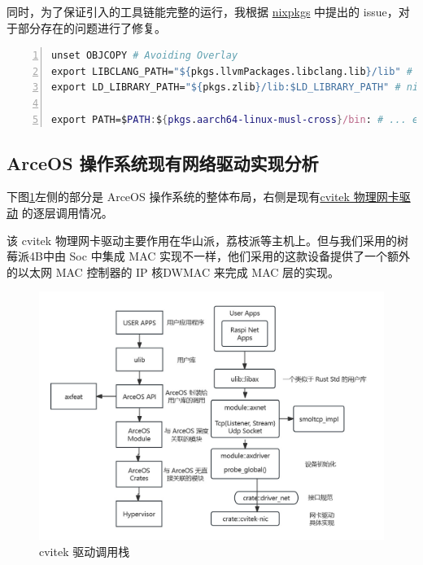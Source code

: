     同时，为了保证引入的工具链能完整的运行，我根据 \href{https://github.com/nixos/nixpkgs}{nixpkgs} 中提出的 issue，对于部分存在的问题进行了修复。

    \begin{lstlisting}[language=nix
        , caption=flakes 特殊适配
        , numbers = left
        , breaklines=true
        , breakatwhitespace=true]
unset OBJCOPY # Avoiding Overlay
export LIBCLANG_PATH="${pkgs.llvmPackages.libclang.lib}/lib" # nixpkgs@52447
export LD_LIBRARY_PATH="${pkgs.zlib}/lib:$LD_LIBRARY_PATH" # nixpkgs@92946

export PATH=$PATH:${pkgs.aarch64-linux-musl-cross}/bin: # ... etc
    \end{lstlisting}



\subsection{ArceOS 操作系统现有网络驱动实现分析}

    下图\ref{fig::cvitek}左侧的部分是 ArceOS 操作系统的整体布局，右侧是现有\href{https://github.com/yuoo655/arceos_net/tree/hsp}{cvitek 物理网卡驱动} 的逐层调用情况。

    该 cvitek 物理网卡驱动主要作用在华山派，荔枝派等主机上。但与我们采用的树莓派4B中由 Soc 中集成 MAC 实现不一样，他们采用的这款设备提供了一个额外的以太网 MAC 控制器的 IP 核DWMAC 来完成 MAC 层的实现。

        
    \begin{figure}[ht]
        \centering
        \includegraphics[scale=0.4]{imgs/cvitek.jpg}
        \caption{cvitek 驱动调用栈}    \label{fig::cvitek}
    \end{figure}

